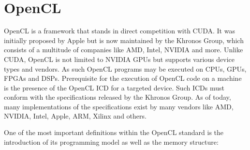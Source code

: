 \section{OpenCL}

OpenCL is a framework that stands in direct competition with CUDA. It was initially proposed by Apple but is now maintained by the Khronos Group, which consists of a multitude of companies like AMD, Intel, NVIDIA and more. Unlike CUDA, OpenCL is not limited to NVIDIA GPUs but supports various device types and vendors. As such OpenCL programs may be executed on CPUs, GPUs, FPGAs and DSPs. Prerequisite for the execution of OpenCL code on a machine is the presence of the OpenCL ICD for a targeted device. Such ICDs must conform with the specifications released by the Khronos Group. As of today, many implementations of the specifications exist by many vendors like AMD, NVIDIA, Intel, Apple, ARM, Xilinx and others.

One of the most important definitions within the OpenCL standard is the introduction of its programming model as well as the memory structure:

